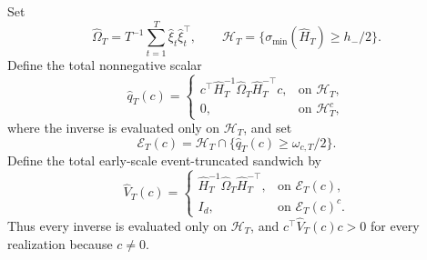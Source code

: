 Set
\[
 \widehat\Omega_T=T^{-1}\sum_{t=1}^T\widehat\xi_t\widehat\xi_t^\top,
 \qquad
 \mathcal H_T=\{\sigma_{\min}(\widehat H_T)\ge h_-/2\}.
\]
Define the total nonnegative scalar
\[
 \widehat q_T(c)=
 \begin{cases}
 c^\top\widehat H_T^{-1}\widehat\Omega_T\widehat H_T^{-\top}c,
   &\text{on }\mathcal H_T,\\
 0,&\text{on }\mathcal H_T^c,
 \end{cases}
\]
where the inverse is evaluated only on \(\mathcal H_T\), and set
\[
 \mathcal E_T(c)=\mathcal H_T\cap\{\widehat q_T(c)\ge\omega_{c,T}/2\}.
\]
Define the total early-scale event-truncated sandwich by
\[
 \widehat V_T(c)=
 \begin{cases}
 \widehat H_T^{-1}\widehat\Omega_T\widehat H_T^{-\top},
   &\text{on }\mathcal E_T(c),\\
 I_d,&\text{on }\mathcal E_T(c)^c.
 \end{cases}
\]
Thus every inverse is evaluated only on \(\mathcal H_T\), and \(c^\top\widehat V_T(c)c>0\) for every realization because \(c\ne0\).